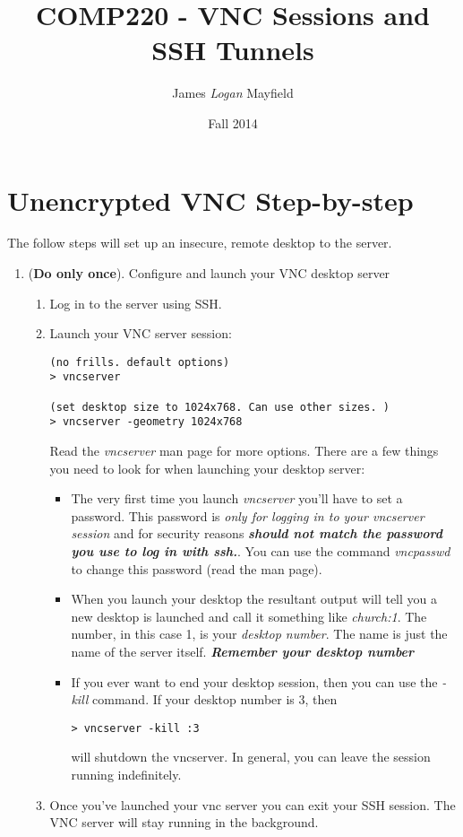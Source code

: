 \documentclass[10pt]{article}
\title{COMP220 - VNC Sessions and SSH Tunnels}
\author{James \textit{Logan} Mayfield  }
\date{Fall 2014}
\begin{document}
\maketitle

\section{Unencrypted VNC Step-by-step}

The follow steps will set up an insecure, remote desktop to the server.
\begin{enumerate}
\item (\textbf{Do only once}). Configure and launch your VNC desktop server
\begin{enumerate}
\item Log in to the server using SSH.
\item Launch your VNC server session:
\begin{verbatim}
(no frills. default options)
> vncserver

(set desktop size to 1024x768. Can use other sizes. )
> vncserver -geometry 1024x768
\end{verbatim}
Read the \textit{vncserver} man page for more options.  There are a few things you need to look for when launching your desktop server:
\begin{itemize}
\item The very first time you launch \textit{vncserver} you'll have to set a password.  This password is \textit{only for logging in to your vncserver session} and for security reasons \textbf{\textit{should not match the password you use to log in with ssh.}}.  You can use the command \textit{vncpasswd} to change this password (read the man page).
\item When you launch your desktop the resultant output will tell you a new desktop is launched and call it something like \textit{church:1}.  The number, in this case 1, is your \textit{desktop number}. The name is just the name of the server itself. \textit{\textbf{Remember your desktop number}}
\item If you ever want to end your desktop session, then you can use the \textit{-kill} command. If your desktop number is $3$, then
\begin{verbatim}
> vncserver -kill :3
\end{verbatim}
will shutdown the vncserver. In general, you can leave the session running indefinitely. 
\end{itemize}
\item Once you've launched your vnc server you can exit your SSH session. The VNC server will stay running in the background.
\end{enumerate}


\end{enumerate}
\end{document}

